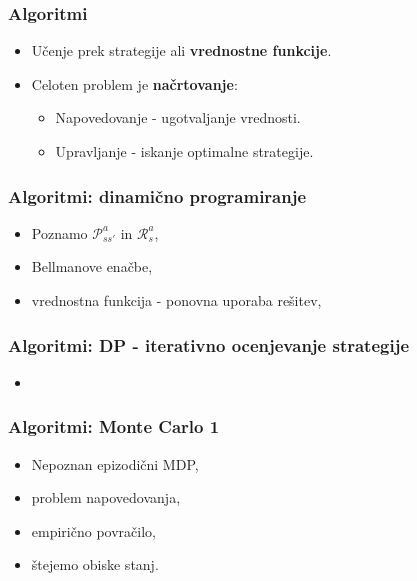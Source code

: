 \documentclass{beamer}    %
\begin{document}
\begin{frame}
    \frametitle{Algoritmi}
    \begin{itemize}
        \item Učenje prek strategije ali \textbf{vrednostne funkcije}. 
        \item Celoten problem je \textbf{načrtovanje}:
        \begin{itemize}
            \item Napovedovanje - ugotvaljanje vrednosti.
            \item Upravljanje - iskanje optimalne strategije. 
        \end{itemize}
    \end{itemize}
\end{frame}


\begin{frame}
    \frametitle{Algoritmi: dinamično programiranje}
    \begin{itemize}
        \item Poznamo $\mathcal{P}_{ss'}^a$ in $\mathcal{R}_s^a$, 
        \item Bellmanove enačbe, 
        \item vrednostna funkcija - ponovna uporaba rešitev,  
    \end{itemize}
\end{frame}


\begin{frame}
    \frametitle{Algoritmi: DP - iterativno ocenjevanje strategije}
    \begin{itemize}
        \item   
    \end{itemize}
\end{frame}


\begin{frame}
    \frametitle{Algoritmi: Monte Carlo 1}
    \begin{itemize}
        \item Nepoznan epizodični MDP, 
        \item problem napovedovanja, 
        \item empirično povračilo, 
        \item štejemo obiske stanj.
    \end{itemize}
\end{frame}
\end{document}
